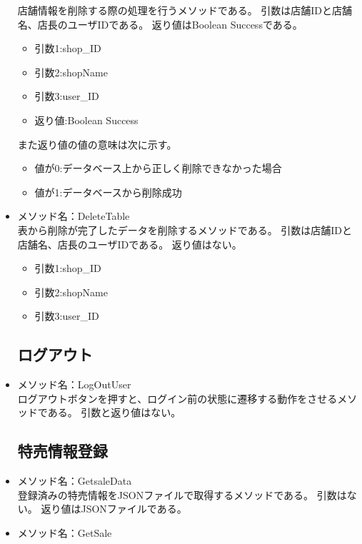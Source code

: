 \documentclass[a4j]{jarticle}
\begin{document}
\begin{itemize}
店舗情報を削除する際の処理を行うメソッドである。
引数は店舗IDと店舗名、店長のユーザIDである。
返り値はBoolean Successである。

	\begin{itemize}
		\item 引数1:shop\_ID
		\item 引数2:shopName
		\item 引数3:user\_ID
		\item 返り値:Boolean Success
	\end{itemize}
また返り値の値の意味は次に示す。
	\begin{itemize}
		\item 値が0:データベース上から正しく削除できなかった場合
		\item 値が1:データベースから削除成功
	\end{itemize}

\item メソッド名：DeleteTable\\

表から削除が完了したデータを削除するメソッドである。
引数は店舗IDと店舗名、店長のユーザIDである。
返り値はない。
	\begin{itemize}
		\item 引数1:shop\_ID
		\item 引数2:shopName
		\item 引数3:user\_ID
	\end{itemize}

\subsection{ログアウト}
%
\item メソッド名：LogOutUser\\
ログアウトボタンを押すと、ログイン前の状態に遷移する動作をさせるメソッドである。
引数と返り値はない。
%
\subsection{特売情報登録}
\item メソッド名：GetsaleData\\

登録済みの特売情報をJSONファイルで取得するメソッドである。
引数はない。
返り値はJSONファイルである。

\item メソッド名：GetSale\\


\end{itemize}
\end{document}

